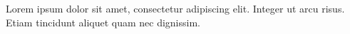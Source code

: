 
\noindent
Lorem ipsum dolor sit amet, consectetur adipiscing elit.\citep{Nacuzzi:2007} Integer ut arcu risus. Etiam tincidunt aliquet quam nec dignissim.